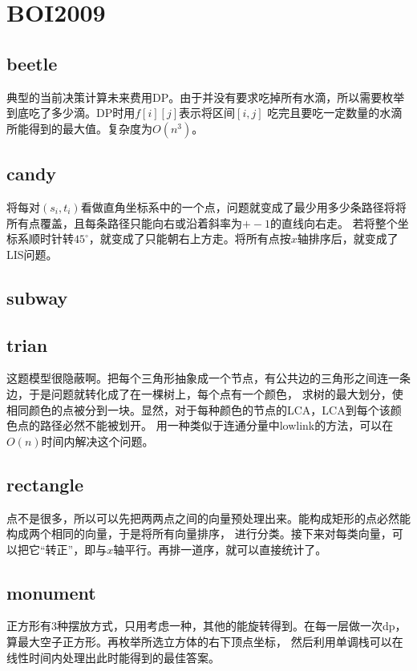 \section{BOI2009}
\subsection{beetle}
典型的当前决策计算未来费用DP。由于并没有要求吃掉所有水滴，所以需要枚举到底吃了多少滴。DP时用$f[i][j]$表示将区间$[i,j]$
吃完且要吃一定数量的水滴所能得到的最大值。复杂度为$O(n^3)$。
\subsection{candy}
将每对$(s_i, t_i)$看做直角坐标系中的一个点，问题就变成了最少用多少条路径将将所有点覆盖，且每条路径只能向右或沿着斜率为$+-1$的直线向右走。
若将整个坐标系顺时针转$45^{\circ}$，就变成了只能朝右上方走。将所有点按$x$轴排序后，就变成了LIS问题。
\subsection{subway}
\subsection{trian}
这题模型很隐蔽啊。把每个三角形抽象成一个节点，有公共边的三角形之间连一条边，于是问题就转化成了在一棵树上，每个点有一个颜色，
求树的最大划分，使相同颜色的点被分到一块。显然，对于每种颜色的节点的LCA，LCA到每个该颜色点的路径必然不能被划开。
用一种类似于连通分量中lowlink的方法，可以在$O(n)$时间内解决这个问题。
\subsection{rectangle}
点不是很多，所以可以先把两两点之间的向量预处理出来。能构成矩形的点必然能构成两个相同的向量，于是将所有向量排序，
进行分类。接下来对每类向量，可以把它“转正”，即与$x$轴平行。再排一道序，就可以直接统计了。
\subsection{monument}
正方形有3种摆放方式，只用考虑一种，其他的能旋转得到。在每一层做一次dp，算最大空子正方形。再枚举所选立方体的右下顶点坐标，
然后利用单调栈可以在线性时间内处理出此时能得到的最佳答案。 
